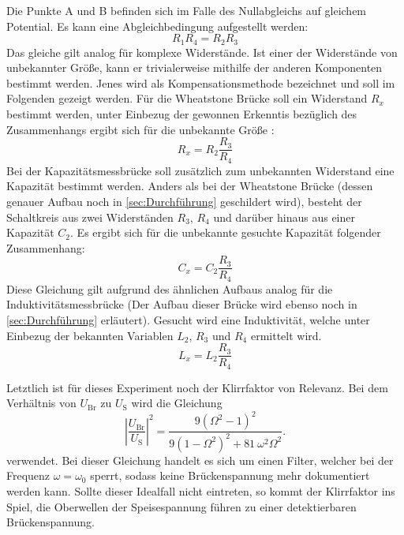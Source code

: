 \par\vspace{0.5em}
\noindent Die Punkte A und B befinden sich im Falle des Nullabgleichs auf
gleichem Potential. Es kann eine Abgleichbedingung aufgestellt werden:
\begin{equation}
    \label{eqn:1}
    R_1 R_4 = R_2 R_3
\end{equation}
Das gleiche gilt analog für komplexe Widerstände. Ist einer der Widerstände 
von unbekannter Größe, kann er trivialerweise mithilfe der anderen Komponenten 
bestimmt werden. Jenes wird als Kompensationsmethode bezeichnet und soll im 
Folgenden gezeigt werden.
\noindent Für die Wheatstone Brücke soll ein Widerstand $R_x$ bestimmt werden,
unter Einbezug der gewonnen Erkenntis bezüglich des Zusammenhangs ergibt sich 
für die unbekannte Größe \cite{anleitung}:
\begin{equation}
    \label{eqn:2}
    R_x = R_2 \frac{R_3}{R_4}
\end{equation}
\noindent Bei der Kapazitätsmessbrücke soll zusätzlich zum unbekannten Widerstand
eine Kapazität bestimmt werden. Anders als bei der Wheatstone Brücke (dessen 
genauer Aufbau noch in \autoref{sec:Durchführung} geschildert wird), besteht der 
Schaltkreis aus zwei Widerständen $R_3$, $R_4$ und darüber hinaus aus einer 
Kapazität $C_2$. Es ergibt sich für die unbekannte gesuchte Kapazität folgender 
Zusammenhang:
\begin{equation}
    \label{eqn:3}
    C_x = C_2 \frac{R_3}{R_4}
\end{equation}
Diese Gleichung gilt aufgrund des ähnlichen Aufbaus analog für die Induktivitätsmessbrücke
(Der Aufbau dieser Brücke wird ebenso noch in \autoref{sec:Durchführung} erläutert).
Gesucht wird eine Induktivität, welche unter Einbezug der bekannten Variablen 
$L_2$, $R_3$ und $R_4$ ermittelt wird.
\begin{equation}
    \label{eqn:4}
    L_x = L_2 \frac{R_3}{R_4}
\end{equation}

\noindent Letztlich ist für dieses Experiment noch der Klirrfaktor von Relevanz. Bei dem 
Verhältnis von $U_{\text{Br}}$ zu $U_{\text{S}}$ wird die Gleichung
\begin{equation}
    \label{eqn:omega}
    \left|\frac{U_{\text{Br}}}{U_{\text{S}}}\right|^2 = \frac{9(\Omega ^2 -1)^2}{9(1-\Omega^2)^2+81 \: \omega ^2 \Omega^2}.
\end{equation}
verwendet. Bei dieser Gleichung handelt es sich um einen Filter, welcher bei der Frequenz 
$\omega=\omega_0$ sperrt, sodass keine Brückenspannung mehr dokumentiert werden 
kann. Sollte dieser Idealfall nicht eintreten, so kommt der Klirrfaktor ins Spiel, 
die Oberwellen der Speisespannung führen zu einer detektierbaren Brückenspannung.

